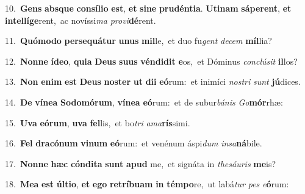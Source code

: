 {{\numbfont\textcolor{\numbcolor}{10.}}~\textbf{Gens} \textbf{abs}\-\textbf{que} \textbf{con}\-\textbf{sí}\textbf{li}\textbf{o} \textbf{est}\-, \textbf{et} \textbf{si}\-\textbf{ne} \textbf{pru}\-\textbf{dén}\textbf{ti}\textbf{a}. \textbf{U}\-\textbf{ti}\textbf{nam} \textbf{sá}\-\textbf{pe}\textbf{rent}, \textbf{et} \textbf{in}\-\textbf{tel}\textbf{lí}\textbf{ge}rent,~\star ac novíssi\textit{ma} \textit{pro}\-\textit{vi}\textbf{dé}rent.\par
{\numbfont\textcolor{\numbcolor}{11.}}~\-\textbf{Quó}\-\textbf{mo}\textbf{do} \textbf{per}\-\textbf{se}\textbf{quá}\textbf{tur} \textbf{u}\-\textbf{nus} \textbf{mil}\-le,~\star et duo fu\textit{gent} \textit{de}\-\textit{cem} \textbf{míl}\-lia?\par
{\numbfont\textcolor{\numbcolor}{12.}}~\-\textbf{Non}\-\textbf{ne} \textbf{íd}\-\textbf{e}\textbf{o}, \textbf{qui}\-\textbf{a} \textbf{De}\-\textbf{us} \textbf{su}\-\textbf{us} \textbf{vén}\-\textbf{di}\textbf{dit} \textbf{e}\-os,~\star et Dóminus \textit{con}\-\textit{clú}\textit{sit} \textbf{il}\-los?\par
{\numbfont\textcolor{\numbcolor}{13.}}~\textbf{Non} \textbf{e}\-\textbf{nim} \textbf{est} \textbf{De}\-\textbf{us} \textbf{nos}\-\textbf{ter} \textbf{ut} \textbf{di}\-\textbf{i} \textbf{e}\-\textbf{ó}rum:~\star et inimíci \textit{nos}\-\textit{tri} \textit{sunt} \textbf{jú}\-dices.\par
{\numbfont\textcolor{\numbcolor}{14.}}~\textbf{De} \textbf{ví}\-\textbf{ne}\textbf{a} \textbf{So}\-\textbf{do}\textbf{mó}\textbf{rum}, \textbf{ví}\-\textbf{ne}\textbf{a} \textbf{e}\-\textbf{ó}rum:~\star et de subur\-\textit{bá}\-\textit{nis} \textit{Go}\-\textbf{mór}rhæ:\par
{\numbfont\textcolor{\numbcolor}{15.}}~\-\textbf{U}\-\textbf{va} \textbf{e}\-\textbf{ó}\textbf{rum}, \textbf{u}\-\textbf{va} \textbf{fel}\-lis,~\star et bo\textit{tri} \textit{a}\-\textit{ma}\textbf{rís}simi.\par
{\numbfont\textcolor{\numbcolor}{16.}}~\textbf{Fel} \textbf{dra}\-\textbf{có}\textbf{num} \textbf{vi}\-\textbf{num} \textbf{e}\-\textbf{ó}rum:~\star et venénum áspi\textit{dum} \textit{in}\-\textit{sa}\textbf{ná}bile.\par
{\numbfont\textcolor{\numbcolor}{17.}}~\-\textbf{Non}\-\textbf{ne} \textbf{hæc} \textbf{cón}\-\textbf{di}\textbf{ta} \textbf{sunt} \textbf{a}\-\textbf{pud} me,~\star et signáta in \textit{the}\-\textit{sáu}\textit{ris} \textbf{me}\-is?\par
{\numbfont\textcolor{\numbcolor}{18.}}~\-\textbf{Me}\-\textbf{a} \textbf{est} \textbf{úl}\-\textbf{ti}\textbf{o}, \textbf{et} \textbf{e}\-\textbf{go} \textbf{re}\-\textbf{trí}\textbf{bu}\textbf{am} \textbf{in} \textbf{tém}\-\textbf{po}re,~\star ut labá\textit{tur} \textit{pes} \textit{e}\-\textbf{ó}rum:\par
}
